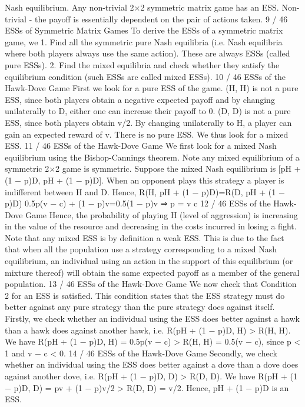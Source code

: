 \documentclass[]{report}
\begin{document}
Nash equilibrium.
Any non-trivial 2×2 symmetric matrix game has an ESS.
Non-trivial - the payoff is essentially dependent on the pair of
actions taken.
9 / 46
ESSs of Symmetric Matrix Games
To derive the ESSs of a symmetric matrix game, we
1. Find all the symmetric pure Nash equilibria (i.e. Nash
equilibria where both players always use the same
action). These are always ESSs (called pure ESSs).
2. Find the mixed equilibria and check whether they
satisfy the equilibrium condition (such ESSs are
called mixed ESSs).
10 / 46
ESSs of the Hawk-Dove Game
First we look for a pure ESS of the game.
(H, H) is not a pure ESS, since both players obtain a negative
expected payoff and by changing unilaterally to D, either one can
increase their payoff to 0.
(D, D) is not a pure ESS, since both players obtain v/2. By
changing unilaterally to H, a player can gain an expected reward of
v.
There is no pure ESS. We thus look for a mixed ESS.
11 / 46
ESSs of the Hawk-Dove Game
We first look for a mixed Nash equilibrium using the
Bishop-Cannings theorem.
Note any mixed equilibrium of a symmetric 2×2 game is
symmetric.
Suppose the mixed Nash equilibrium is
[pH + (1 − p)D, pH + (1 − p)D]. When an opponent plays this
strategy a player is indifferent between H and D. Hence,
R(H, pH + (1 − p)D)=R(D, pH + (1 − p)D)
0.5p(v − c) + (1 − p)v=0.5(1 − p)v ⇒ p =
v
c
12 / 46
ESSs of the Hawk-Dove Game
Hence, the probability of playing H (level of aggression) is
increasing in the value of the resource and decreasing in the costs
incurred in losing a fight.
Note that any mixed ESS is by definition a weak ESS.
This is due to the fact that when all the population use a strategy
corresponding to a mixed Nash equilibrium, an individual using an
action in the support of this equilibrium (or mixture thereof) will
obtain the same expected payoff as a member of the general
population.
13 / 46
ESSs of the Hawk-Dove Game
We now check that Condition 2 for an ESS is satisfied.
This condition states that the ESS strategy must do better against
any pure strategy than the pure strategy does against itself.
Firstly, we check whether an individual using the ESS does better
against a hawk than a hawk does against another hawk, i.e.
R(pH + (1 − p)D, H) > R(H, H). We have
R(pH + (1 − p)D, H) = 0.5p(v − c) > R(H, H) = 0.5(v − c),
since p < 1 and v − c < 0.
14 / 46
ESSs of the Hawk-Dove Game
Secondly, we check whether an individual using the ESS does
better against a dove than a dove does against another dove, i.e.
R(pH + (1 − p)D, D) > R(D, D). We have
R(pH + (1 − p)D, D) = pv + (1 − p)v/2 > R(D, D) = v/2.
Hence, pH + (1 − p)D is an ESS.
\end{document}
